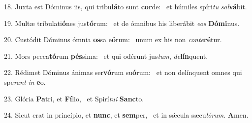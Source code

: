 18. Juxta est Dóminus iis, qui tribu\textbf{lá}to sunt \textbf{cor}de: \ast\  et húmiles spíri\textit{tu} \textit{sal}\textbf{vá}bit.\

19. Multæ tribulati\textbf{ó}nes jus\textbf{tó}rum: \ast\  et de ómnibus his liberábit \textit{e}\textit{os} \textbf{Dó}\textbf{mi}nus.\

20. Custódit Dóminus ómnia \textbf{os}sa e\textbf{ó}rum: \ast\  unum ex his non \textit{con}\textit{te}\textbf{ré}tur.\

21. Mors pecca\textbf{tó}rum \textbf{pés}sima: \ast\  et qui odérunt jus\textit{tum}, \textit{de}\textbf{lín}quent.\

22. Rédimet Dóminus ánimas ser\textbf{vó}rum su\textbf{ó}rum: \ast\  et non delínquent omnes qui spe\textit{rant} \textit{in} \textbf{e}o.\

23. Glória \textbf{Pa}tri, et \textbf{Fí}lio, \ast\  et Spirí\textit{tu}\textit{i} \textbf{Sanc}to.\

24. Sicut erat in princípio, et \textbf{nunc}, et \textbf{sem}per, \ast\  et in sǽcula sæcu\textit{ló}\textit{rum}. \textbf{A}men.\


